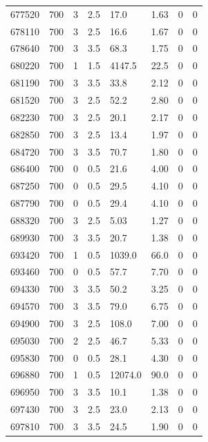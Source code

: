 \documentclass[preview]{standalone}
\begin{document}
{{{{{{{\begin{tabular}{L{1.2cm}C{1.2cm} C{0.3cm}C{0.5cm} C{1.4cm}C{1.4cm} C{1.4cm}C{1.4cm}}
  677520  &   700  & 3     & 2.5 &  17.0  & 1.63  & 0 &  0   \\ 
  678110  &   700  & 3     & 2.5 &  16.6  & 1.67  & 0 &  0   \\ 
  678640  &   700  & 3     & 3.5 &  68.3  & 1.75  & 0 &  0   \\ 
  680220  &   700  & 1     & 1.5 &  4147.5  & 22.5  & 0 &  0   \\ 
  681190  &   700  & 3     & 3.5 &  33.8  & 2.12  & 0 &  0   \\ 
  681520  &   700  & 3     & 2.5 &  52.2  & 2.80  & 0 &  0   \\ 
  682230  &   700  & 3     & 2.5 &  20.1  & 2.17  & 0 &  0   \\ 
  682850  &   700  & 3     & 2.5 &  13.4  & 1.97  & 0 &  0   \\ 
  684720  &   700  & 3     & 3.5 &  70.7  & 1.80  & 0 &  0   \\ 
  686400  &   700  & 0     & 0.5 &  21.6  & 4.00  & 0 &  0   \\ 
  687250  &   700  & 0     & 0.5 &  29.5  & 4.10  & 0 &  0   \\ 
  687790  &   700  & 0     & 0.5 &  29.4  & 4.10  & 0 &  0   \\ 
  688320  &   700  & 3     & 2.5 &  5.03  & 1.27  & 0 &  0   \\ 
  689930  &   700  & 3     & 3.5 &  20.7  & 1.38  & 0 &  0   \\ 
  693420  &   700  & 1     & 0.5 &  1039.0  & 66.0  & 0 &  0   \\ 
  693460  &   700  & 0     & 0.5 &  57.7  & 7.70  & 0 &  0   \\ 
  694330  &   700  & 3     & 3.5 &  50.2  & 3.25  & 0 &  0   \\ 
  694570  &   700  & 3     & 3.5 &  79.0  & 6.75  & 0 &  0   \\ 
  694900  &   700  & 3     & 2.5 &  108.0  & 7.00  & 0 &  0   \\ 
  695030  &   700  & 2     & 2.5 &  46.7  & 5.33  & 0 &  0   \\ 
  695830  &   700  & 0     & 0.5 &  28.1  & 4.30  & 0 &  0   \\ 
  696880  &   700  & 1     & 0.5 &  12074.0  & 90.0  & 0 &  0   \\ 
  696950  &   700  & 3     & 3.5 &  10.1  & 1.38  & 0 &  0   \\ 
  697430  &   700  & 3     & 2.5 &  23.0  & 2.13  & 0 &  0   \\ 
  697810  &   700  & 3     & 3.5 &  24.5  & 1.90  & 0 &  0   \\ 
\hline 
\end{tabular} 

}}}}}}}
\end{document}
